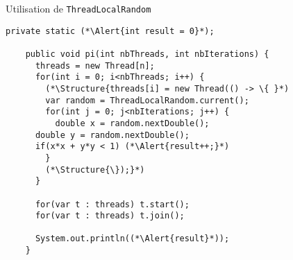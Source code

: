 
\begingroup

\begin{frame}[fragile]{Utilisation de \texttt{ThreadLocalRandom}}

  \begin{lstlisting}[gobble=4]
    private static (*\Alert{int result = 0}*);

    public void pi(int nbThreads, int nbIterations) {
      threads = new Thread[n];
      for(int i = 0; i<nbThreads; i++) {
        (*\Structure{threads[i] = new Thread(() -> \{ }*)
        var random = ThreadLocalRandom.current();
        for(int j = 0; j<nbIterations; j++) {
          double x = random.nextDouble();
	  double y = random.nextDouble();
	  if(x*x + y*y < 1) (*\Alert{result++;}*)
        }
        (*\Structure{\});}*)
      }
      
      for(var t : threads) t.start();
      for(var t : threads) t.join();
      
      System.out.println((*\Alert{result}*));
    }
  \end{lstlisting}

  
\end{frame}

\endgroup
\endinput
